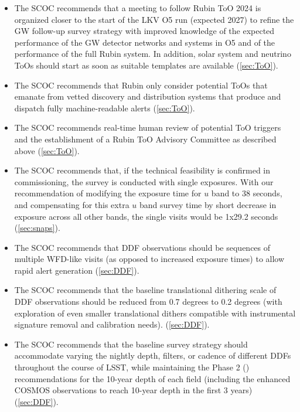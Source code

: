 \begin{itemize}
\item The SCOC recommends that a meeting to follow Rubin ToO 2024 is organized closer to the start of the LKV O5 run (expected 2027) to refine the GW follow-up survey strategy with improved knowledge of the expected performance of the GW detector networks and systems in O5 and of the performance of the full Rubin system. In addition, solar system and neutrino ToOs should start as soon as suitable templates are available (\autoref{sec:ToO}).

\item The SCOC recommends that Rubin only consider potential ToOs that emanate from vetted discovery and distribution systems that produce and dispatch fully machine-readable alerts (\autoref{sec:ToO}).

\item The SCOC recommends real-time human review of potential ToO triggers and the establishment of a Rubin ToO Advisory Committee as described above (\autoref{sec:ToO}).

\item The SCOC recommends that, if the technical feasibility is confirmed in commissioning, the survey is conducted with single exposures. With our recommendation of modifying the exposure time for $u$ band to 38 seconds, and compensating for this extra $u$ band survey time by short decrease in exposure across all other bands, the single visits would be 1x29.2 seconds (\autoref{sec:snaps}).

\item The SCOC recommends that DDF observations should be sequences of multiple WFD-like visits (as opposed to increased exposure times) to allow rapid alert generation (\autoref{sec:DDF}).

\item The SCOC recommends that the baseline translational dithering scale of DDF observations should be reduced from 0.7 degrees to 0.2 degrees (with exploration of even smaller translational dithers compatible with instrumental signature removal and calibration needs). (\autoref{sec:DDF}).

\item The SCOC recommends that the baseline survey strategy should accommodate varying the nightly depth, filters, or cadence of different DDFs throughout the course of LSST, while maintaining the Phase 2 (\citep{PSTN-055}) recommendations for the 10-year depth of each field (including the enhanced COSMOS observations to reach 10-year depth in the first 3 years) (\autoref{sec:DDF}).


\end{itemize}
